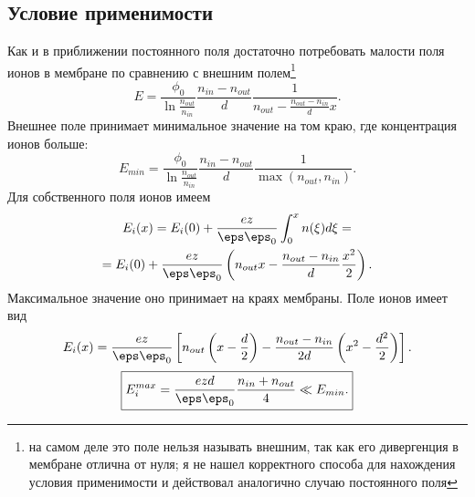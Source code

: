 \documentclass{hedwork}
\begin{document}
\subsection{Условие применимости}
    Как и в приближении постоянного поля достаточно потребовать малости поля
    ионов в мембране по сравнению с внешним полем\footnote{на самом деле это
    поле нельзя называть внешним, так как его дивергенция в мембране отлична от
    нуля; я не нашел корректного способа для нахождения условия применимости и
    действовал аналогично случаю постоянного поля}
    \[
        E = \frac{\phi_0}{\ln\frac{n_{out}}{n_{in}}}
            \frac{n_{in} - n_{out}}{d}
            \frac{1}{n_{out} - \frac{n_{out} - n_{in}}{d} x}.
    \]
    Внешнее поле принимает минимальное значение на том краю, где концентрация
    ионов больше:
    \[
        E_{min} = \frac{\phi_0}{\ln\frac{n_{out}}{n_{in}}}
            \frac{n_{in} - n_{out}}{d}\frac{1}{\max(n_{out}, n_{in})}.
    \]
    Для собственного поля ионов имеем
    \begin{gather}
        E_i(x) = E_i(0) + \frac{ez}{\eps\eps_0}\int_0^x n(\xi)d\xi = \nonumber\\
        = E_i(0) + \frac{ez}{\eps\eps_0}\left(
        n_{out} x - \frac{n_{out} - n_{in}}{d}\frac{x^2}{2}\right).
    \end{gather}
    Максимальное значение оно принимает на краях мембраны. Поле ионов имеет вид
    \begin{equation}
        E_i(x) = \frac{ez}{\eps\eps_0}\left[
        n_{out} \left(x-\frac{d}{2}\right) - \frac{n_{out} - n_{in}}{2d}
        \left(x^2 - \frac{d^2}{2}\right)
        \right].
    \end{equation}
    \begin{equation}
        \boxed{
        E_i^{max} = \frac{ezd}{\eps\eps_0}\frac{n_{in}+n_{out}}{4} \ll E_{min}.}
    \end{equation}
\end{document}
